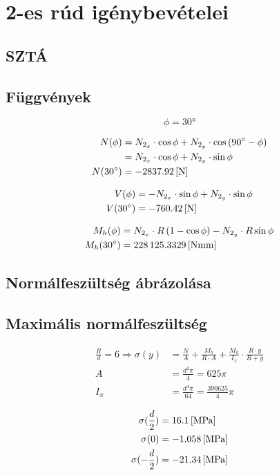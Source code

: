 \section{2-es rúd igénybevételei}

\subsection{SZTÁ}

\newpage

\subsection{Függvények}

\begin{equation*}
	\phi = \ang{30}
\end{equation*}

\begin{align*}
	N(\phi) 
	&= N_{2_x} \cdot \cos\phi + N_{2_y} \cdot \cos\left(\ang{90}-\phi\right) \\
	&= N_{2_x} \cdot \cos\phi + N_{2_y} \cdot \sin\phi \\
	N(\ang{30}) &= \SI{-2837.92}{[\newton]}
\end{align*}

\begin{align*}
	V(\phi) &= -N_{2_x} \cdot \sin\phi + N_{2_y} \cdot \sin\phi \\
	V(\ang{30}) &= \SI{-760.42}{[\newton]}
\end{align*}

\begin{align*}
	M_h(\phi) &= N_{2_x} \cdot R \left(1 - \cos\phi\right) - N_{2_y} \cdot R\sin\phi \\
	M_h(\ang{30}) &= \nmm{228125.3329}
\end{align*}

\newpage

\subsection{Normálfeszültség ábrázolása}

\subsection{Maximális normálfeszültség}

\begin{align*}
	\frac{R}{d} = 6 \Rightarrow \sigma(y) &= \frac{N}{A} + \frac{M_h}{R\cdot A} + \frac{M_h}{I_x} \cdot \frac{R\cdot y}{R+y} \\
	A &= \frac{d^2 \pi}{4} = 625\pi \\
	I_x &= \frac{d^4 \pi}{64} = \frac{390625}{4}\pi
\end{align*}

\begin{align*}
	\sigma(\frac{d}{2}) &= \SI{16.1}{[\mega\pascal]} \\
	\sigma(0) &= \SI{-1.058}{[\mega\pascal]} \\
	\sigma(-\frac{d}{2}) &= \SI{-21.34}{[\mega\pascal]}
\end{align*}
